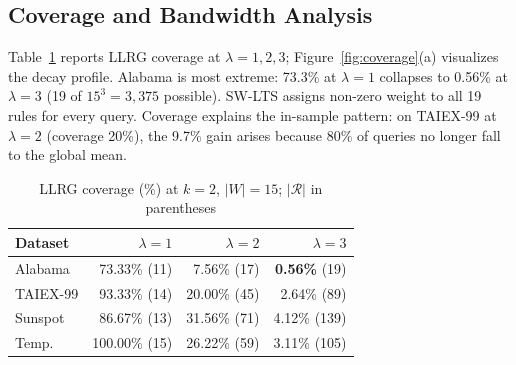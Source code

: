 \documentclass{llncs}
\begin{document}
\begin{table}[htbp]
\caption{Walk-forward evaluation ($\lambda=3$). Naive: $\hat{y}_t{=}y_{t-1}$.
$\Delta$(\%): SW-LTS vs.\ HO-LTS (from unrounded values; Temperature shown
to 3 d.p.). $p$: one-sided bootstrap $P[\mathrm{MSE(HO)-MSE(SW)}\leq 0]$.
$^{***}p{<}0.001$; $^\dagger n_{\text{test}}{=}7$, completeness only.}
\label{tab:walkforward}
\centering
{}
\end{table}

\subsection{Coverage and Bandwidth Analysis}
\label{sec:coverage}

Table~\ref{tab:coverage} reports LLRG coverage at $\lambda=1,2,3$;
Figure~\ref{fig:coverage}(a) visualizes the decay profile. Alabama is
most extreme: 73.3\% at $\lambda=1$ collapses to 0.56\% at $\lambda=3$
(19 of $15^3=3{,}375$ possible). SW-LTS assigns non-zero weight to
all 19 rules for every query. Coverage explains the in-sample pattern:
on TAIEX-99 at $\lambda=2$ (coverage 20\%), the 9.7\% gain arises
because 80\% of queries no longer fall to the global mean.

\begin{table}[htbp]
\caption{LLRG coverage (\%) at $k=2$, $|W|=15$;
$|\mathcal{R}|$ in parentheses}
\label{tab:coverage}
\centering
\begin{tabular}{@{}l|r|r|r@{}}
\toprule
Dataset  & $\lambda=1$ & $\lambda=2$ & $\lambda=3$ \\
\midrule
Alabama  & 73.33\% (11) & 7.56\% (17) & \textbf{0.56\%} (19) \\
TAIEX-99 & 93.33\% (14) & 20.00\% (45) & 2.64\% (89) \\
Sunspot  & 86.67\% (13) & 31.56\% (71) & 4.12\% (139) \\
Temp.    & 100.00\% (15) & 26.22\% (59) & 3.11\% (105) \\
\bottomrule
\end{tabular}
\end{table}
\end{document}
